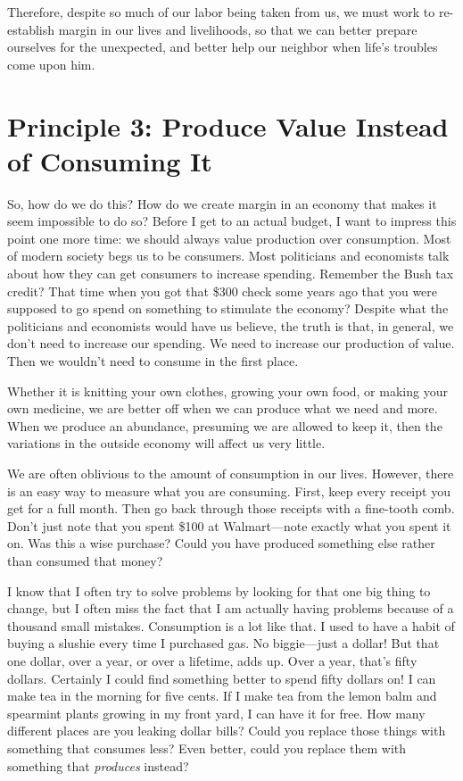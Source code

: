 Therefore, despite so much of our labor being taken from us, we must
work to re-establish margin in our lives and livelihoods, so that we
can better prepare ourselves for the unexpected, and better help our
neighbor when life's troubles come upon him.

\section{Principle 3: Produce Value Instead of Consuming It}

So, how do we do this?
How do we create margin in an economy that makes it seem impossible to
do so? Before I get to an actual budget, I want to impress this point
one more time: we should always value production over consumption.
Most of modern society begs us to be
consumers. Most politicians and economists talk about how they can get
consumers to increase spending.  Remember the Bush tax
credit?  That time when you got that \$300 check some years ago that
you were supposed to go spend on something to stimulate the economy?
Despite what the politicians and economists would have us believe, 
the truth is that, in general, we don't need to increase our spending. We
need to increase our production of value. Then we
wouldn't need to consume in the first place.

Whether it is knitting your own clothes, growing your own food, or
making your own medicine, we are better off when we can produce what we
need and more. When we produce an abundance, presuming we are allowed
to keep it, then the variations in the outside economy will affect us
very little. 

We are often oblivious to the amount of consumption in our lives.
However, there is an easy way to measure what you are consuming. First,
keep every receipt you get for a full month. Then go back through those
receipts with a fine-tooth comb. Don't just note that
you spent \$100 at Walmart---note exactly what you spent it on. Was this
a wise purchase? Could you have produced something else rather than
consumed that money?  

I know that I often try to solve problems by looking for that one big
thing to change, but I often miss the fact that I am actually having
problems because of a thousand small mistakes. Consumption is a lot
like that. I used to have a habit of buying a slushie every time I
purchased gas. No biggie---just a dollar!  But that one dollar, over a
year, or over a lifetime, adds up. Over a year, that's
fifty dollars. Certainly I could find something better to spend fifty
dollars on!  I can make tea in the morning for five cents. If I make
tea from the lemon balm and spearmint plants growing in my front yard,
I can have it for free. How many different places are you leaking
dollar bills?  Could you replace those
things with something that consumes less?  Even better, could you
replace them with something that \textit{produces} instead?

